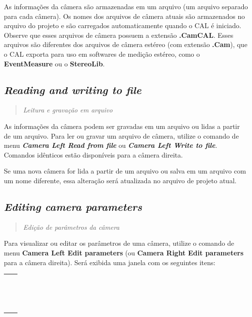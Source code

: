 \documentclass[
  12pt,
  letterpaper,
  DIV=11,
  numbers=noendperiod]{scrreprt}
\begin{document}
As informações da câmera são armazenadas em um arquivo (um arquivo
separado para cada câmera). Os nomes dos arquivos de câmera atuais são
armazenados no arquivo do projeto e são carregados automaticamente
quando o CAL é iniciado. Observe que esses arquivos de câmera possuem a
extensão \textbf{.CamCAL}. Esses arquivos são diferentes dos arquivos de
câmera estéreo (com extensão \textbf{.Cam}), que o CAL exporta para uso
em softwares de medição estéreo, como o \textbf{EventMeasure} ou o
\textbf{StereoLib}.

\subsection{\texorpdfstring{\emph{Reading and writing to
file}}{Reading and writing to file}}\label{reading-and-writing-to-file}

\begin{quote}
\emph{Leitura e gravação em arquivo}
\end{quote}

As informações da câmera podem ser gravadas em um arquivo ou lidas a
partir de um arquivo. Para ler ou gravar um arquivo de câmera, utilize o
comando de menu \textbf{\emph{Camera \textbar{} Left \textbar{} Read
from file}} ou \textbf{\emph{Camera \textbar{} Left \textbar{} Write to
file}}. Comandos idênticos estão disponíveis para a câmera direita.

Se uma nova câmera for lida a partir de um arquivo ou salva em um
arquivo com um nome diferente, essa alteração será atualizada no arquivo
de projeto atual.

\subsection{\texorpdfstring{\emph{Editing camera
parameters}}{Editing camera parameters}}\label{sec-editing-camera-parameters}

\begin{quote}
\emph{Edição de parâmetros da câmera}
\end{quote}

Para visualizar ou editar os parâmetros de uma câmera, utilize o comando
de menu \textbf{Camera \textbar{} Left \textbar{} Edit parameters} (ou
\textbf{Camera \textbar{} Right \textbar{} Edit parameters} para a
câmera direita). Será exibida uma janela com os seguintes itens:

\begin{longtable}[]{@{}ll@{}}
\toprule\noalign{}
\endhead
\bottomrule\noalign{}
\endlastfoot
& \\
& \\
& \\
& \\
& \\
& \\
& \\
& \\
& \\
& \\
& \\
& \\
& \\
& \\
& \\
\end{longtable}
\end{document}
